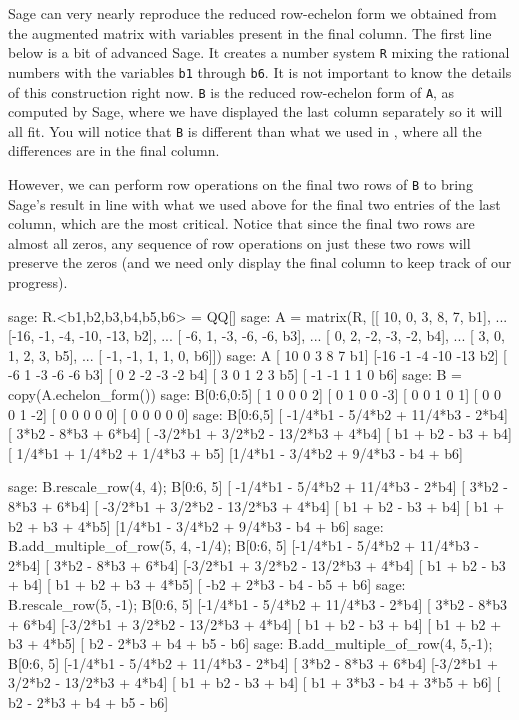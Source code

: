 Sage can very nearly reproduce the reduced row-echelon form we obtained from the augmented matrix with variables present in the final column.  The first line below is a bit of advanced Sage.  It creates a number system \verb?R? mixing the rational numbers with the variables \verb?b1? through \verb?b6?.  It is not important to know the details of this construction right now.  \verb?B? is the reduced row-echelon form of \verb?A?, as computed by Sage, where we have displayed the last column separately so it will all fit.  You will notice that \verb?B? is different than what we used in , where all the differences are in the final column.\par
%
However, we can perform row operations on the final two rows of \verb?B? to bring Sage's result in line with what we used above for the final two entries of the last column, which are the most critical.  Notice that since the final two rows are almost all zeros, any sequence of row operations on just these two rows will preserve the zeros (and we need only display the final column to keep track of our progress).
%
\begin{sageexample}
sage: R.<b1,b2,b3,b4,b5,b6> = QQ[]
sage: A = matrix(R, [[ 10,  0,  3,   8,   7, b1],
...                  [-16, -1, -4, -10, -13, b2],
...                  [ -6,  1, -3,  -6,  -6, b3],
...                  [  0,  2, -2,  -3,  -2, b4],
...                  [  3,  0,  1,   2,   3, b5],
...                  [ -1, -1,  1,   1,   0, b6]])
sage: A
[ 10   0   3   8   7  b1]
[-16  -1  -4 -10 -13  b2]
[ -6   1  -3  -6  -6  b3]
[  0   2  -2  -3  -2  b4]
[  3   0   1   2   3  b5]
[ -1  -1   1   1   0  b6]
sage: B = copy(A.echelon_form())
sage: B[0:6,0:5]
[ 1  0  0  0  2]
[ 0  1  0  0 -3]
[ 0  0  1  0  1]
[ 0  0  0  1 -2]
[ 0  0  0  0  0]
[ 0  0  0  0  0]
sage: B[0:6,5]
[ -1/4*b1 - 5/4*b2 + 11/4*b3 - 2*b4]
[                3*b2 - 8*b3 + 6*b4]
[ -3/2*b1 + 3/2*b2 - 13/2*b3 + 4*b4]
[                 b1 + b2 - b3 + b4]
[     1/4*b1 + 1/4*b2 + 1/4*b3 + b5]
[1/4*b1 - 3/4*b2 + 9/4*b3 - b4 + b6]

sage: B.rescale_row(4, 4); B[0:6, 5]
[ -1/4*b1 - 5/4*b2 + 11/4*b3 - 2*b4]
[                3*b2 - 8*b3 + 6*b4]
[ -3/2*b1 + 3/2*b2 - 13/2*b3 + 4*b4]
[                 b1 + b2 - b3 + b4]
[               b1 + b2 + b3 + 4*b5]
[1/4*b1 - 3/4*b2 + 9/4*b3 - b4 + b6]
sage: B.add_multiple_of_row(5, 4, -1/4); B[0:6, 5]
[-1/4*b1 - 5/4*b2 + 11/4*b3 - 2*b4]
[               3*b2 - 8*b3 + 6*b4]
[-3/2*b1 + 3/2*b2 - 13/2*b3 + 4*b4]
[                b1 + b2 - b3 + b4]
[              b1 + b2 + b3 + 4*b5]
[        -b2 + 2*b3 - b4 - b5 + b6]
sage: B.rescale_row(5, -1); B[0:6, 5]
[-1/4*b1 - 5/4*b2 + 11/4*b3 - 2*b4]
[               3*b2 - 8*b3 + 6*b4]
[-3/2*b1 + 3/2*b2 - 13/2*b3 + 4*b4]
[                b1 + b2 - b3 + b4]
[              b1 + b2 + b3 + 4*b5]
[         b2 - 2*b3 + b4 + b5 - b6]
sage: B.add_multiple_of_row(4, 5,-1); B[0:6, 5]
[-1/4*b1 - 5/4*b2 + 11/4*b3 - 2*b4]
[               3*b2 - 8*b3 + 6*b4]
[-3/2*b1 + 3/2*b2 - 13/2*b3 + 4*b4]
[                b1 + b2 - b3 + b4]
[       b1 + 3*b3 - b4 + 3*b5 + b6]
[         b2 - 2*b3 + b4 + b5 - b6]
\end{sageexample}
